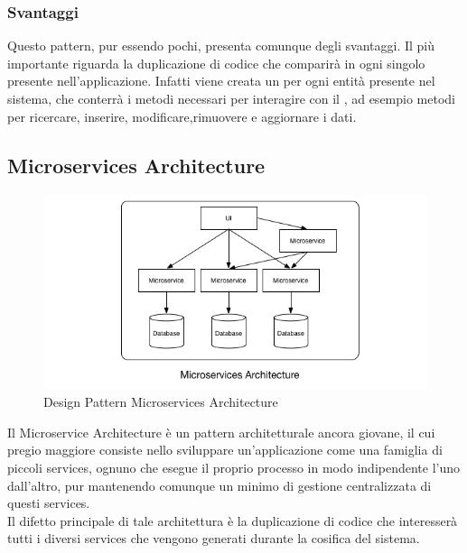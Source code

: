 \documentclass[a4paper, titlepage]{article}
\begin{document}
\subsubsection{Svantaggi}
Questo pattern, pur essendo pochi, presenta comunque degli svantaggi. Il più importante riguarda la duplicazione di codice che comparirà in ogni singolo  presente nell'applicazione. Infatti viene creata un  per ogni entità presente nel sistema, che conterrà i metodi necessari per interagire con il , ad esempio metodi per ricercare, inserire, modificare,rimuovere e aggiornare i dati.

\subsection{Microservices Architecture}
\begin{figure}[htp]
\centering
\includegraphics[scale=0.75]{Img/microservice.png}
\caption{Design Pattern Microservices Architecture}
\label{}
\end{figure}
Il Microservice Architecture è un pattern architetturale ancora giovane, il cui pregio maggiore consiste nello sviluppare un'applicazione come una famiglia di piccoli services, ognuno che esegue il proprio processo in modo indipendente l'uno dall'altro, pur mantenendo comunque un minimo di gestione centralizzata di questi services.
\\ Il difetto principale di tale architettura è la duplicazione di codice che interesserà tutti i diversi services che vengono generati durante la cosifica del sistema.
\end{document}
